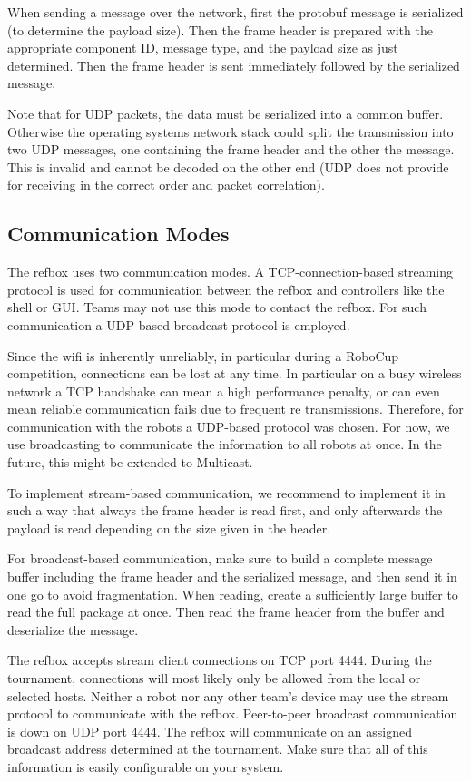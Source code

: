\documentclass[a4paper]{article}
\begin{document}
When sending a message over the network, first the protobuf message is
serialized (to determine the payload size). Then the frame header is
prepared with the appropriate component ID, message type, and the
payload size as just determined. Then the frame header is sent
immediately followed by the serialized message.

Note that for UDP packets, the data must be serialized into a common
buffer. Otherwise the operating systems network stack could split the
transmission into two UDP messages, one containing the frame header
and the other the message. This is invalid and cannot be decoded on
the other end (UDP does not provide for receiving in the correct order
and packet correlation).

\subsection{Communication Modes}
The refbox uses two communication modes. A TCP-connection-based
streaming protocol is used for communication between the refbox and
controllers like the shell or GUI. Teams may not use this mode to
contact the refbox. For such communication a UDP-based broadcast
protocol is employed.

Since the wifi is inherently unreliably, in particular during a
RoboCup competition, connections can be lost at any time. In
particular on a busy wireless network a TCP handshake can mean a
high performance penalty, or can even mean reliable communication
fails due to frequent re transmissions. Therefore, for
communication with the robots a UDP-based protocol was chosen. For
now, we use broadcasting to communicate the information to all
robots at once. In the future, this might be extended to Multicast.

To implement stream-based communication, we recommend to implement it
in such a way that always the frame header is read first, and only
afterwards the payload is read depending on the size given in the
header.

For broadcast-based communication, make sure to build a complete
message buffer including the frame header and the serialized message,
and then send it in one go to avoid fragmentation. When reading,
create a sufficiently large buffer to read the full package at
once. Then read the frame header from the buffer and deserialize the
message.

The refbox accepts stream client connections on TCP port 4444. During
the tournament, connections will most likely only be allowed from the
local or selected hosts. Neither a robot nor any other team's device
may use the stream protocol to communicate with the
refbox. Peer-to-peer broadcast communication is down on UDP port
4444. The refbox will communicate on an assigned broadcast address
determined at the tournament. Make sure that all of this information
is easily configurable on your system.
\end{document}
